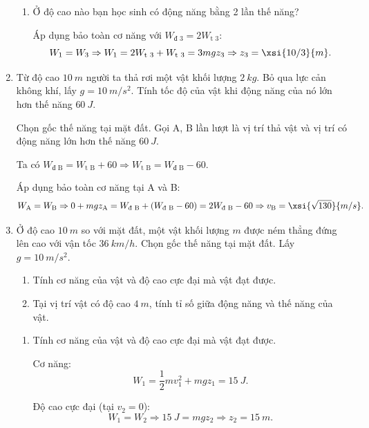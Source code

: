 \begin{enumerate}[label=\bfseries Câu \arabic*:, leftmargin=1.5cm]
{\begin{enumerate}[label=\alph*)]
			Chọn gốc thế năng tại mặt nước. Áp dụng bảo toàn cơ năng:
			$$W_1 = W_2 \Rightarrow 0 + mgz_1 = \dfrac{1}{2}mv_2^2 + 0 \Rightarrow v_2 = \xsi{10\sqrt 2}{m/s}.$$
			\item Ở độ cao nào bạn học sinh có động năng bằng 2 lần thế năng?
			
			Áp dụng bảo toàn cơ năng với $W_\text{đ 3} = 2 W_\text{t 3}$:
			$$W_1 = W_3 \Rightarrow W_1 = 2W_\text{t 3} + W_\text{t 3} = 3 mgz_3 \Rightarrow z_3 = \xsi{10/3}{m}.$$
		\end{enumerate}
	}

	\item {}
	
	
	{
		Từ độ cao $\SI{10}{m}$ người ta thả rơi một vật khối lượng $\SI{2}{kg}$. Bỏ qua lực cản không khí, lấy $g=\SI{10}{m/s^2}$. Tính tốc độ của vật khi động năng của nó lớn hơn thế năng $\SI{60}{J}$.
	}
	
	\hideall
	{	
		Chọn gốc thế năng tại mặt đất. Gọi A, B lần lượt là vị trí thả vật và vị trí có động năng lớn hơn thế năng $\SI{60}{J}$. 
		
		Ta có $W_\text{đ B} = W_\text{t B} + 60 \Rightarrow W_\text{t B} = W_\text{đ B} - 60$.
		
		Áp dụng bảo toàn cơ năng tại A và B:
		$$W_\text{A} = W_\text{B} \Rightarrow 0 + mgz_\text{A} = W_\text{đ B} + (W_\text{đ B} - 60) = 2 W_\text{đ B} - 60 \Rightarrow v_\text{B} = \xsi{\sqrt{130}}{m/s}.$$
	}
	
	\item {}
	
	
	{
		Ở độ cao $\SI{10}{m}$ so với mặt đất, một vật khối lượng $m$ được ném thẳng đứng lên cao với vận tốc $\SI{36}{km/h}$. Chọn gốc thế năng tại mặt đất. Lấy $g=\SI{10}{m/s^2}$.
		\begin{enumerate}[label=\alph*)]
			\item Tính cơ năng của vật và độ cao cực đại mà vật đạt được.
			\item Tại vị trí vật có độ cao $\SI{4}{m}$, tính tỉ số giữa động năng và thế năng của vật.
		\end{enumerate}
	}
	
	\hideall
	{	
		\begin{enumerate}[label=\alph*)]
			\item Tính cơ năng của vật và độ cao cực đại mà vật đạt được.
			
			Cơ năng: $$W_1=\dfrac{1}{2}mv_1^2 + mgz_1 = \SI{15}{J}.$$
			
			Độ cao cực đại (tại $v_2 = 0$):
			$$W_1 = W_2 \Rightarrow \SI{15}{J} = mgz_2 \Rightarrow z_2 = \SI{15}{m}.$$
			

\end{enumerate}}
\end{enumerate}
